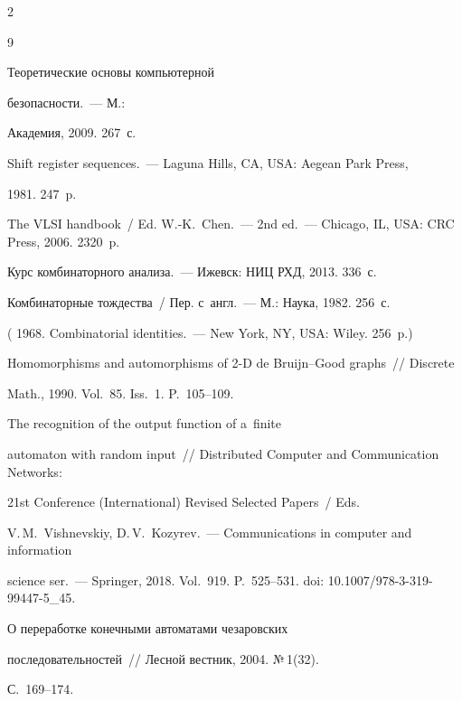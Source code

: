 \begin{multicols}{2}
{{ \begin{thebibliography}{9}


  




 Теоретические основы компьютерной 


безопасности.~--- М.: 


Академия, 2009. 267~с.




 Shift register sequences.~--- Laguna Hills, CA, USA: Aegean Park Press, 


1981. 247~p.




The VLSI handbook~/ Ed. W.-K.~Chen.~--- 2nd ed.~--- Chicago, IL, USA: CRC Press, 2006. 2320~p. 




 Курс комбинаторного анализа.~--- Ижевск: НИЦ РХД, 2013. 336~с. 




 Комбинаторные тождества~/ Пер. с~англ.~--- М.: Наука, 1982. 256~с. 


( 1968. Combinatorial identities.~--- New York, NY, USA: Wiley. 256~p.)




 Homomorphisms and automorphisms of 2-D de Bruijn--Good graphs~// Discrete 


Math., 1990. Vol.~85. Iss.~1. P.~105--109. 




 The recognition of the output function of a~finite 


automaton with random input~// Distributed Computer and Communication Networks: 


21st Conference (International) Revised Selected Papers~/ Eds. 


V.\,M.~Vishnevskiy, D.\,V.~Kozyrev.~--- Communications in computer and information 


science ser.~--- Springer, 2018. Vol.~919. P.~525--531. doi: 10.1007/978-3-319-99447-5\_45.




 О переработке конечными автоматами чезаровских 


последовательностей~// Лесной вестник, 2004. №\,1(32). 


С.~169--174.


\end{thebibliography}





 }


 }





\end{multicols}





